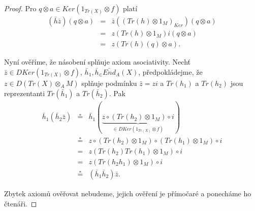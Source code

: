 \begin{proof}
           Pro $q\otimes a \in Ker(1_{Tr(X)}\otimes f)$ platí
            \begin{eqnarray}
            (\bar h\bar z)(q\otimes a)
             &=& \bar z((Tr(h)\otimes 1_M)_{Ker})(q\otimes a)  \nonumber \\
             &=& z(Tr(h)\otimes 1_M)i(q\otimes a)   \nonumber \\
             &=& z(Tr(h)(q)\otimes a).  \nonumber
          \end{eqnarray}
        
          Nyní ověříme, že násobení splňuje axiom asociativity. Nechť $\bar z\in DKer(1_{Tr(X)}\otimes 
          f)$, $\bar h_1,\bar h_\in\bar{End}_A(X)$, předpokládejme, že $z\in D(Tr(X)\otimes_A M)$ 
          splňuje podmínku $\bar z = zi$ a $Tr(h_1)$ a $Tr(h_2)$ jsou 
          reprezentanti $Tr(\bar h_1)$ a  $Tr(\bar h_2)$. Pak
          \begin{eqnarray}
            \bar h_1(\bar h_2 \bar z)
              &\overset{*}{=}& \bar h_1 (\underbrace{z\circ (Tr(h_2)\otimes 1_M)\circ i}_{\in DKer(1_{Tr(X)}\otimes f)})  \nonumber \\
              &\overset{*}{=}& z \circ (Tr(h_2)\otimes 1_M) \circ (Tr(h_1)\otimes 1_M) \circ i   \nonumber \\
              &=& z (Tr(h_2)Tr(h_1)\otimes 1_M) \circ i \nonumber \\
              &=& z (Tr(h_2h_1)\otimes 1_M) \circ i \nonumber \\
              &\overset{*}{=}& (\bar h_1 \bar h_2)\bar z.  \nonumber
          \end{eqnarray}
        
          Zbytek axiomů ověřovat nebudeme, jejich ověření je přímočaré a ponecháme ho čtenáři.
        \end{proof}       
          

